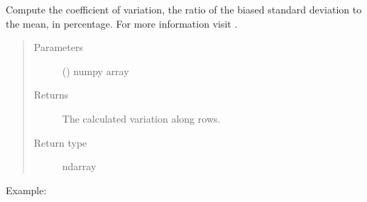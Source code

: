 \documentclass[letterpaper,10pt,english]{sphinxmanual}
\begin{document}
\begin{fulllineitems}
\label{\detokenize{_autosummary/analytics_core.analytics:analytics_core.analytics.analytics.calculate_coefficient_variation}}
Compute the coefficient of variation, the ratio of the biased standard 
deviation to the mean, in percentage. For more information 
visit .
\begin{quote}\begin{description}
\item[{Parameters}] \leavevmode
{} () \textendash{} numpy array

\item[{Returns}] \leavevmode
The calculated variation along rows.

\item[{Return type}] \leavevmode
ndarray

\end{description}\end{quote}

Example:

\begin{sphinxVerbatim}[commandchars=\\\{\}]
  
\end{sphinxVerbatim}

\end{fulllineitems}

\end{document}
